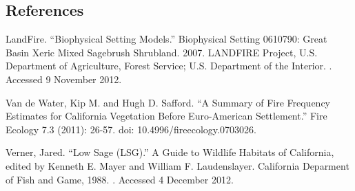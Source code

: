 \clearpage
\subsection*{References}
\begin{hangparas}{.25in}{1} LandFire. ``Biophysical Setting Models.'' Biophysical Setting 0610790: Great Basin Xeric Mixed Sagebrush Shrubland. 2007. LANDFIRE Project, U.S. Department of Agriculture, Forest Service; U.S. Department of the Interior. . Accessed 9 November 2012.

Van de Water, Kip M. and Hugh D. Safford. ``A Summary of Fire Frequency Estimates for California Vegetation Before Euro-American Settlement.'' Fire Ecology 7.3 (2011): 26-57. doi: 10.4996/fireecology.0703026.

Verner, Jared. ``Low Sage (LSG).'' A Guide to Wildlife Habitats of California, edited by Kenneth E. Mayer and William F. Laudenslayer. California Deparment of Fish and Game, 1988. . Accessed 4 December 2012.
\end{hangparas}


